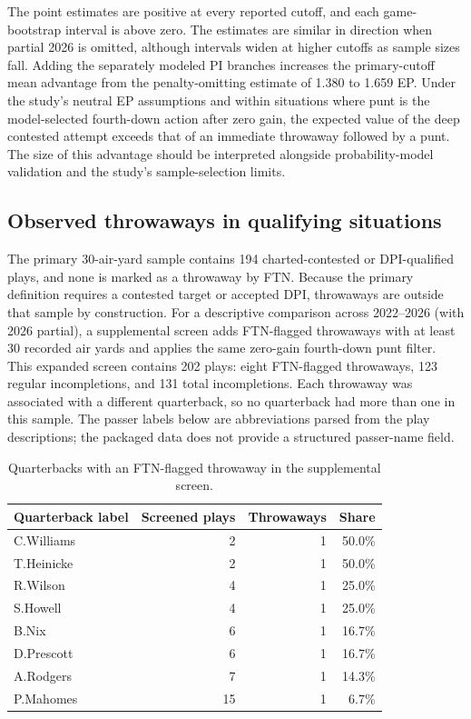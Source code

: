 \documentclass[11pt]{article}
\begin{document}
The point estimates are positive at every reported cutoff, and each game-bootstrap interval is above zero. The estimates are similar in direction when partial 2026 is omitted, although intervals widen at higher cutoffs as sample sizes fall. Adding the separately modeled PI branches increases the primary-cutoff mean advantage from the penalty-omitting estimate of 1.380 to 1.659 EP. Under the study's neutral EP assumptions and within situations where punt is the model-selected fourth-down action after zero gain, the expected value of the deep contested attempt exceeds that of an immediate throwaway followed by a punt. The size of this advantage should be interpreted alongside probability-model validation and the study's sample-selection limits.

\subsection{Observed throwaways in qualifying situations}

The primary 30-air-yard sample contains 194 charted-contested or DPI-qualified plays, and none is marked as a throwaway by FTN. Because the primary definition requires a contested target or accepted DPI, throwaways are outside that sample by construction. For a descriptive comparison across 2022--2026 (with 2026 partial), a supplemental screen adds FTN-flagged throwaways with at least 30 recorded air yards and applies the same zero-gain fourth-down punt filter. This expanded screen contains 202 plays: eight FTN-flagged throwaways, 123 regular incompletions, and 131 total incompletions. Each throwaway was associated with a different quarterback, so no quarterback had more than one in this sample. The passer labels below are abbreviations parsed from the play descriptions; the packaged data does not provide a structured passer-name field.

\begin{table}[htbp]
\centering
\caption{Quarterbacks with an FTN-flagged throwaway in the supplemental screen.}
\small
\begin{tabular}{lrrr}
\toprule
Quarterback label & Screened plays & Throwaways & Share \\
\midrule
C.Williams & 2 & 1 & 50.0\% \\
T.Heinicke & 2 & 1 & 50.0\% \\
R.Wilson & 4 & 1 & 25.0\% \\
S.Howell & 4 & 1 & 25.0\% \\
B.Nix & 6 & 1 & 16.7\% \\
D.Prescott & 6 & 1 & 16.7\% \\
A.Rodgers & 7 & 1 & 14.3\% \\
P.Mahomes & 15 & 1 & 6.7\% \\
\bottomrule
\end{tabular}
\end{table}
\end{document}
